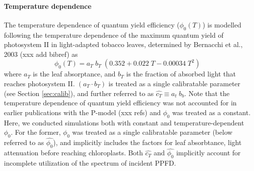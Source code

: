 \documentclass{myreport}
\begin{document}
\paragraph{Temperature dependence}
The temperature dependence of quantum yield efficiency ($\phi_0(T)$) is modelled following the temperature dependence of the maximum quantum yield of photosystem II in light-adapted tobacco leaves, determined by Bernacchi et al., 2003 (xxx add bibref) as 
\begin{equation}
\phi_0(T) = a_T \; b_T \; ( 0.352 + 0.022\;T - 0.00034\;T^2 )
\end{equation}
where $a_T$ is the leaf absorptance, and $b_T$ is the fraction of absorbed light that reaches photosystem II. $(a_T \cdot b_T)$ is treated as a single calibratable parameter (see Section \ref{sec:calib}), and further referred to as $\widehat{c_T}\equiv a_t\;b_b$. Note that the temperature dependence of quantum yield efficiency was not accounted for in earlier publications with the P-model (xxx refs) and $\phi_0$ was treated as a constant. Here, we conducted simulations both with constant and temperature-dependent $\phi_0$. For the former, $\phi_0$ was treated as a single calibratable parameter (below referred to as $\widehat{\phi_0}$), and implicitly includes the factors for leaf absorbtance, light attenuation before reaching chloroplasts. Both $\widehat{c_T}$ and $\widehat{\phi_0}$ implicitly account for incomplete utilization of the spectrum of incident PPFD.
\end{document}
